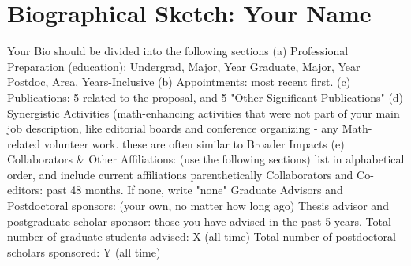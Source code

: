 \documentclass{proposalnsf}
\begin{document}




\section{Biographical Sketch: Your Name}

Your Bio should be divided into the following sections
(a) Professional Preparation (education):
Undergrad, Major, Year
Graduate, Major, Year
Postdoc, Area, Years-Inclusive
(b) Appointments:  most recent first.
(c) Publications:  5 related to the proposal, and 5 "Other Significant Publications"
(d) Synergistic Activities (math-enhancing activities that were not
part of your main job description, like editorial boards and
conference organizing - any Math-related volunteer work.
these are often similar to Broader Impacts
(e) Collaborators & Other Affiliations: (use the following sections)
list in alphabetical order, and include current affiliations parenthetically
Collaborators and Co-editors: past 48 months.  If none, write "none"
Graduate Advisors and Postdoctoral sponsors: (your own, no matter how long ago)
Thesis advisor and postgraduate scholar-sponsor:  those you have advised
in the past 5 years.  
Total number of graduate students advised: X (all time)
Total number of postdoctoral scholars sponsored: Y (all time)


\end{document}
